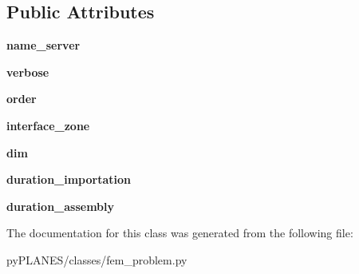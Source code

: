 \subsection*{Public Attributes}
\begin{DoxyCompactItemize}
\item 
\mbox{\label{classpy_p_l_a_n_e_s_1_1classes_1_1fem__problem_1_1_fem_problem_aafceee4e18cf0f7a7e6422ad4687b262}} 
{\bfseries name\+\_\+server}
\item 
\mbox{\label{classpy_p_l_a_n_e_s_1_1classes_1_1fem__problem_1_1_fem_problem_acda71a21344dd0f1250d0ca0a6bd54a6}} 
{\bfseries verbose}
\item 
\mbox{\label{classpy_p_l_a_n_e_s_1_1classes_1_1fem__problem_1_1_fem_problem_aeda1dac1f03f6ace5d02349698fecdb3}} 
{\bfseries order}
\item 
\mbox{\label{classpy_p_l_a_n_e_s_1_1classes_1_1fem__problem_1_1_fem_problem_a5616b175344610a5f49cab753f47f414}} 
{\bfseries interface\+\_\+zone}
\item 
\mbox{\label{classpy_p_l_a_n_e_s_1_1classes_1_1fem__problem_1_1_fem_problem_acaf6839babe57657f539ac5596888731}} 
{\bfseries dim}
\item 
\mbox{\label{classpy_p_l_a_n_e_s_1_1classes_1_1fem__problem_1_1_fem_problem_a7294ee34c7295bba1ef619bcf181897f}} 
{\bfseries duration\+\_\+importation}
\item 
\mbox{\label{classpy_p_l_a_n_e_s_1_1classes_1_1fem__problem_1_1_fem_problem_a7d0400451677296cc8cf720461188f7f}} 
{\bfseries duration\+\_\+assembly}
\end{DoxyCompactItemize}


The documentation for this class was generated from the following file\+:\begin{DoxyCompactItemize}
\item 
py\+P\+L\+A\+N\+E\+S/classes/fem\+\_\+problem.\+py\end{DoxyCompactItemize}

